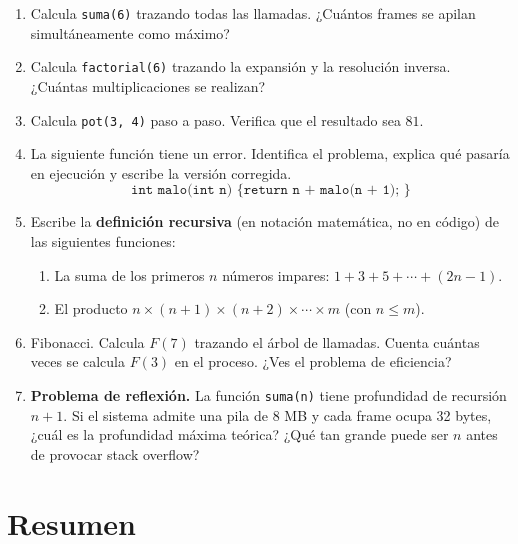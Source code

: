 \documentclass[12pt, oneside]{article}
\begin{document}
\begin{enumerate}

  \item Calcula \texttt{suma(6)} trazando todas las llamadas.
        ¿Cuántos frames se apilan simultáneamente como máximo?

  \item Calcula \texttt{factorial(6)} trazando la expansión y la
        resolución inversa.  ¿Cuántas multiplicaciones se realizan?

  \item Calcula \texttt{pot(3, 4)} paso a paso.
        Verifica que el resultado sea $81$.

  \item La siguiente función tiene un error.  Identifica el problema,
        explica qué pasaría en ejecución y escribe la versión corregida.
        \[
          \texttt{int malo(int n) \{ return n + malo(n + 1); \}}
        \]

  \item Escribe la \textbf{definición recursiva} (en notación matemática,
        no en código) de las siguientes funciones:
        \begin{enumerate}
          \item La suma de los primeros $n$ números impares:
                $1 + 3 + 5 + \cdots + (2n-1)$.
          \item El producto $n \times (n+1) \times (n+2) \times \cdots \times m$
                (con $n \leq m$).
        \end{enumerate}

  \item Fibonacci.  Calcula $F(7)$ trazando el árbol de llamadas.
        Cuenta cuántas veces se calcula $F(3)$ en el proceso.
        ¿Ves el problema de eficiencia?

  \item \textbf{Problema de reflexión.}
        La función \texttt{suma(n)} tiene profundidad de recursión $n+1$.
        Si el sistema admite una pila de 8 MB y cada frame ocupa 32 bytes,
        ¿cuál es la profundidad máxima teórica?
        ¿Qué tan grande puede ser $n$ antes de provocar stack overflow?

\end{enumerate}

\section{Resumen}
\end{document}
